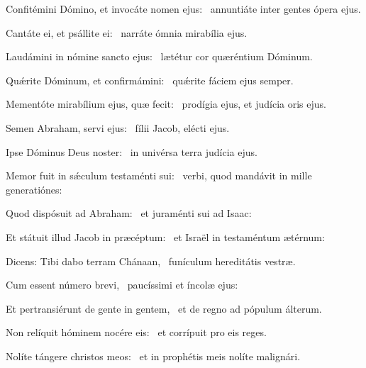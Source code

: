 \item Confitémini Dómino, et invocáte nomen ejus:~\psstar{} annuntiáte inter gentes ópera ejus.

\item Cantáte ei, et psállite ei:~\psstar{} narráte ómnia mirabília ejus.

\item Laudámini in nómine sancto ejus:~\psstar{} lætétur cor quæréntium Dóminum.

\item Quǽrite Dóminum, et confirmámini:~\psstar{} quǽrite fáciem ejus semper.

\item Mementóte mirabílium ejus, quæ fecit:~\psstar{} prodígia ejus, et judícia oris ejus.

\item Semen Abraham, servi ejus:~\psstar{} fílii Jacob, elécti ejus.

\item Ipse Dóminus Deus noster:~\psstar{} in univérsa terra judícia ejus.

\item Memor fuit in sǽculum testaménti sui:~\psstar{} verbi, quod mandávit in mille generatiónes:

\item Quod dispósuit ad Abraham:~\psstar{} et juraménti sui ad Isaac:

\item Et státuit illud Jacob in præcéptum:~\psstar{} et Israël in testaméntum ætérnum:

\item Dicens: Tibi dabo terram Chánaan,~\psstar{} funículum hereditátis vestræ.

\item Cum essent número brevi,~\psstar{} paucíssimi et íncolæ ejus:

\item Et pertransiérunt de gente in gentem,~\psstar{} et de regno ad pópulum álterum.

\item Non relíquit hóminem nocére eis:~\psstar{} et corrípuit pro eis reges.

\item Nolíte tángere christos meos:~\psstar{} et in prophétis meis nolíte malignári.
